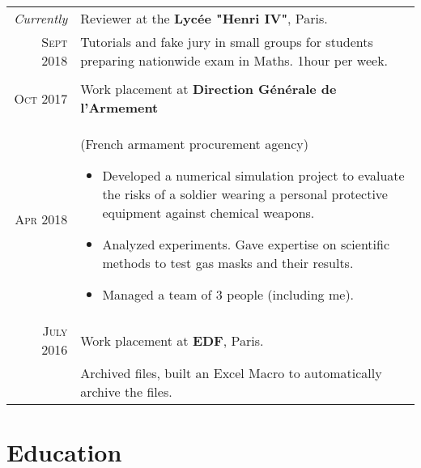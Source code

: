 \documentclass[a4paper,10pt]{article} %
\begin{document}
\begin{tabularx}{\linewidth}{r|X}
  \emph{Currently} & Reviewer at the \textbf{Lycée "Henri IV"}, Paris.\\
  \textsc{Sept 2018} & \small{Tutorials and fake jury in small groups for students preparing nationwide exam in Maths. 1hour per week.}
  \\&\\

\textsc{Oct 2017} & Work placement at \textbf{Direction Générale de l'Armement}\\
\textsc{Apr 2018} & \small{(French armament procurement agency)
\begin{itemize}[noitemsep, nolistsep, leftmargin=0.5cm]
  \item Developed a numerical simulation project to evaluate the risks of a soldier wearing a personal protective equipment against chemical weapons.
  \item Analyzed experiments. Gave expertise on scientific methods to test gas masks and their results.
  \item Managed a team of 3 people (including me).
\end{itemize}}\\


\textsc{July 2016} & Work placement at \textbf{EDF}, Paris. \\
& \small{Archived files, built an Excel Macro to automatically archive the files.}
\end{tabularx}


\section{Education}
\end{document}
